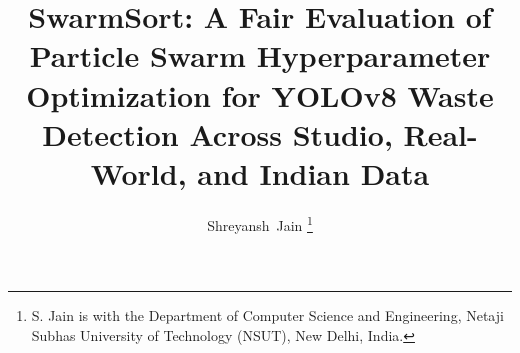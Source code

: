 \documentclass[journal]{IEEEtran}
\begin{document}
\title{SwarmSort: A Fair Evaluation of Particle Swarm Hyperparameter Optimization for YOLOv8 Waste Detection Across Studio, Real-World, and Indian Data}

\author{Shreyansh~Jain%
\thanks{S. Jain is with the Department of Computer Science and Engineering, Netaji Subhas University of Technology (NSUT), New Delhi, India.}}


\maketitle















\end{document}

